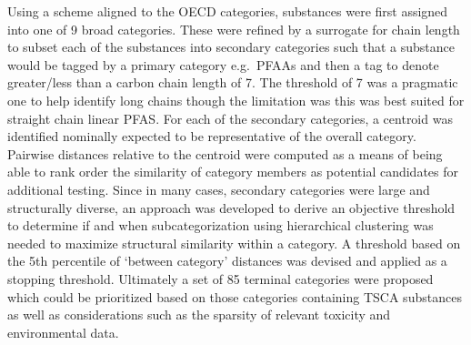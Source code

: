 \documentclass[
  super,
  preprint,
  3p]{elsarticle}
\begin{document}
Using a scheme aligned to the OECD categories, substances were first
assigned into one of 9 broad categories. These were refined by a
surrogate for chain length to subset each of the substances into
secondary categories such that a substance would be tagged by a primary
category e.g.~PFAAs and then a tag to denote greater/less than a carbon
chain length of 7. The threshold of 7 was a pragmatic one to help
identify long chains though the limitation was this was best suited for
straight chain linear PFAS. For each of the secondary categories, a
centroid was identified nominally expected to be representative of the
overall category. Pairwise distances relative to the centroid were
computed as a means of being able to rank order the similarity of
category members as potential candidates for additional testing. Since
in many cases, secondary categories were large and structurally diverse,
an approach was developed to derive an objective threshold to determine
if and when subcategorization using hierarchical clustering was needed
to maximize structural similarity within a category. A threshold based
on the 5th percentile of `between category' distances was devised and
applied as a stopping threshold. Ultimately a set of 85 terminal
categories were proposed which could be prioritized based on those
categories containing TSCA substances as well as considerations such as
the sparsity of relevant toxicity and environmental data.
\end{document}
